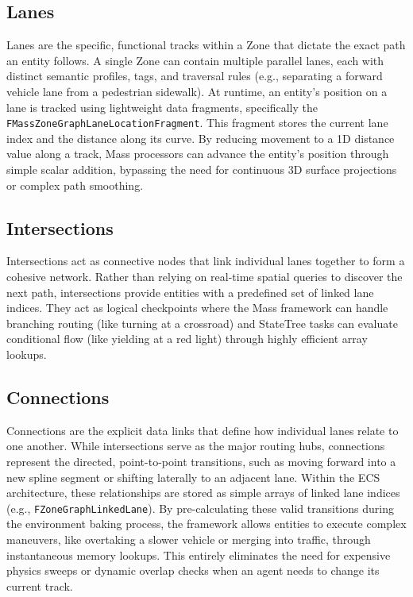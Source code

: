 \subsection{Lanes}
Lanes are the specific, functional tracks within a Zone that dictate the exact path an entity follows. A single Zone can contain multiple parallel lanes, each with distinct semantic profiles, tags, and traversal rules (e.g., separating a forward vehicle lane from a pedestrian sidewalk). At runtime, an entity's position on a lane is tracked using lightweight data fragments, specifically the \texttt{FMassZoneGraphLaneLocationFragment}. This fragment stores the current lane index and the distance along its curve. By reducing movement to a 1D distance value along a track, Mass processors can advance the entity's position through simple scalar addition, bypassing the need for continuous 3D surface projections or complex path smoothing.

\subsection{Intersections} 

Intersections act as connective nodes that link individual lanes together to form a cohesive network. Rather than relying on real-time spatial queries to discover the next path, intersections provide entities with a predefined set of linked lane indices. They act as logical checkpoints where the Mass framework can handle branching routing (like turning at a crossroad) and StateTree tasks can evaluate conditional flow (like yielding at a red light) through highly efficient array lookups.

\subsection{Connections}

Connections are the explicit data links that define how individual lanes relate to one another. While intersections serve as the major routing hubs, connections represent the directed, point-to-point transitions, such as moving forward into a new spline segment or shifting laterally to an adjacent lane. Within the ECS architecture, these relationships are stored as simple arrays of linked lane indices (e.g., \texttt{FZoneGraphLinkedLane}). By pre-calculating these valid transitions during the environment baking process, the framework allows entities to execute complex maneuvers, like overtaking a slower vehicle or merging into traffic, through instantaneous memory lookups. This entirely eliminates the need for expensive physics sweeps or dynamic overlap checks when an agent needs to change its current track.\newline


